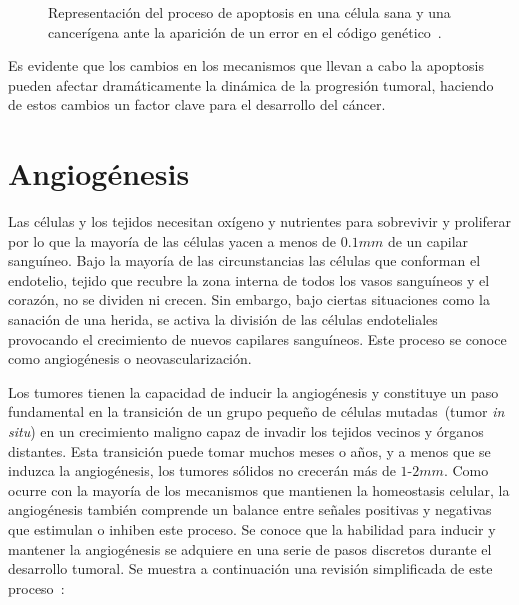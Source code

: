 \begin{figure}[!ht]
\begin{center}
\end{center}\vspace*{-0.6cm}
\caption[Representaci\'on del proceso de apoptosis en una c\'elula sana y una cancer\'igena ante la aparici\'on de un error en el c\'odigo gen\'etico]{Representaci\'on del proceso de apoptosis en una c\'elula sana y una cancer\'igena ante la aparici\'on de un error en el c\'odigo gen\'etico~\cite{robins}.}
\label{fig-apoptosis}
\end{figure}

Es evidente que los cambios en los mecanismos que llevan a cabo la apoptosis pueden afectar dram\'aticamente la din\'amica de la progresi\'on tumoral, haciendo de estos cambios un factor clave para el desarrollo del c\'ancer. 

\section{Angiog\'enesis}
\label{subsec-angio}
Las c\'elulas y los tejidos necesitan ox\'igeno y nutrientes para sobrevivir y proliferar por lo que la mayor\'ia de las c\'elulas yacen a menos de $0$.$1mm$ de un capilar sangu\'ineo. Bajo la mayor\'ia de las circunstancias las c\'elulas que conforman el endotelio, tejido que recubre la zona interna de todos los vasos sangu\'ineos y el coraz\'on, no se dividen ni crecen. Sin embargo, bajo ciertas situaciones como la sanaci\'on de una herida, se activa la divisi\'on de las c\'elulas endoteliales provocando el crecimiento de nuevos capilares sangu\'ineos. Este proceso se conoce como angiog\'enesis o neovascularizaci\'on.

Los tumores tienen la capacidad de inducir la angiog\'enesis y constituye un paso fundamental en la transici\'on de un grupo peque\~no de c\'elulas mutadas~(tumor \textit{in situ}) en un crecimiento maligno capaz de invadir los tejidos vecinos y \'organos distantes. Esta transici\'on puede tomar muchos meses o a\~nos, y a menos que se induzca la angiog\'enesis, los tumores s\'olidos no crecer\'an m\'as de $1$-$2mm$. Como ocurre con la mayor\'ia de los mecanismos que mantienen la homeostasis celular, la angiog\'enesis tambi\'en comprende un balance entre se\~nales positivas y negativas que estimulan o inhiben este proceso. Se conoce que la habilidad para inducir y mantener la angiog\'enesis se adquiere en una serie de pasos discretos durante el desarrollo tumoral. Se muestra a continuaci\'on una revisi\'on simplificada de este proceso~\cite{robins,hanahan,cancerbook}:

